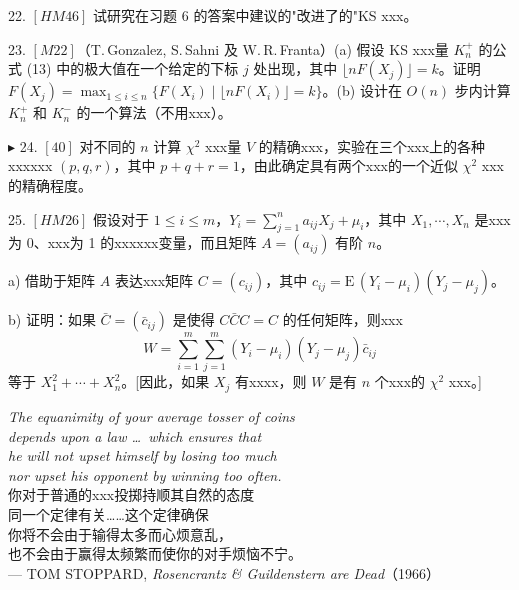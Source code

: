 22. $[HM46]$ 试研究在习题 6 的答案中建议的"改进了的"KS xxx。

23. $[M22]$（T.\,Gonzalez, S.\,Sahni 及 W.\,R.\,Franta）(a) 假设 KS xxx量 $K_n^+$ 的公式 (13) 中的极大值在一个给定的下标 $j$ 处出现，其中 $\lfloor nF(X_j) \rfloor = k$。证明 $F(X_j) = \max_{1 \leqslant i \leqslant n} \{F(X_i) \mid \lfloor nF(X_i) \rfloor = k\}$。(b) 设计在 $O(n)$ 步内计算 $K_n^+$ 和 $K_n^-$ 的一个算法（不用xxx）。

$\blacktriangleright$ 24. $[40]$ 对不同的 $n$ 计算 $\chi^2$ xxx量 $V$ 的精确xxx，实验在三个xxx上的各种xxxxxx $(p, q, r)$，其中 $p + q + r = 1$，由此确定具有两个xxx的一个近似 $\chi^2$ xxx的精确程度。

25. $[HM26]$ 假设对于 $1 \leqslant i \leqslant m$，$Y_i = \sum_{j=1}^{n} a_{ij} X_j + \mu_i$，其中 $X_1, \cdots, X_n$ 是xxx为 0、xxx为 1 的xxxxxx变量，而且矩阵 $A = (a_{ij})$ 有阶 $n$。

a) 借助于矩阵 $A$ 表达xxx矩阵 $C = (c_{ij})$，其中 $c_{ij} = \mathrm{E}\,(Y_i - \mu_i)(Y_j - \mu_j)$。

b) 证明：如果 $\bar{C} = (\bar{c}_{ij})$ 是使得 $C\bar{C}C = C$ 的任何矩阵，则xxx
\[
W = \sum_{i=1}^{m} \sum_{j=1}^{m} (Y_i - \mu_i)(Y_j - \mu_j)\bar{c}_{ij}
\]
等于 $X_1^2 + \cdots + X_n^2$。[因此，如果 $X_j$ 有xxxx，则 $W$ 是有 $n$ 个xxx的 $\chi^2$ xxx。]

\begin{flushright}
\textit{The equanimity of your average tosser of coins}\\
\textit{depends upon a law \ldots\ which ensures that}\\
\textit{he will not upset himself by losing too much}\\
\textit{nor upset his opponent by winning too often.}\\[6pt]
你对于普通的xxx投掷持顺其自然的态度\\
同一个定律有关……这个定律确保\\
你将不会由于输得太多而心烦意乱，\\
也不会由于赢得太频繁而使你的对手烦恼不宁。\\[6pt]
--- TOM STOPPARD, \textit{Rosencrantz \& Guildenstern are Dead}（1966）
\end{flushright}